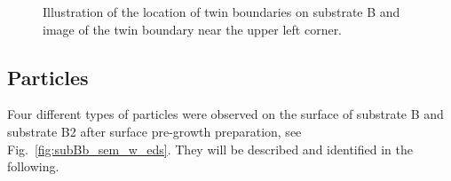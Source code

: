\begin{figure}[htbp]
    \centering
    \begin{subfigure}[t]{0.4\linewidth}
        \caption{}\label{fig:subBb_twins_illustration}
        \centering
    \end{subfigure}
    \hfill
    \begin{subfigure}[t]{0.5333\linewidth}
        \caption{}\label{fig:subBb_sem_twins}
        \centering
    \end{subfigure}
    \caption[Twin boundaries on substrate B.]{ Illustration of the location of twin boundaries on substrate B and   image of the twin boundary near the upper left corner.}\label{fig:subBb_twin_boundaries}
\end{figure}

\subsection{Particles}

Four different types of particles were observed on the surface of substrate B and substrate B2 after surface pre-growth preparation, see Fig.~\ref{fig:subBb_sem_w_eds}. They will be described and identified in the following.

